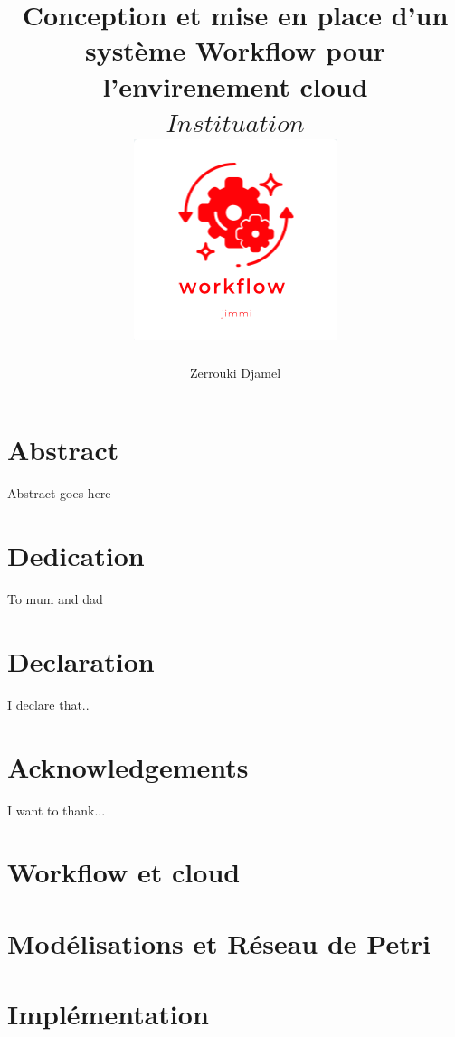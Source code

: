 \documentclass[12pt,twoside]{report}
\title{
	{\textbf{Conception et mise en place d’un système Workflow  pour l’envirenement cloud}} \\   
	{$ Instituation $}\\
	{\includegraphics{logo.PNG}}
}
\author{Zerrouki Djamel}
\begin{document}
\maketitle
 
\chapter*{Abstract}
Abstract goes here

\chapter*{Dedication}
To mum and dad

\chapter*{Declaration}
I declare that..

\chapter*{Acknowledgements}
I want to thank...


\tableofcontents

\chapter{Workflow et cloud}


\chapter{Modélisations et Réseau de Petri}


\chapter{Implémentation}

 
\end{document}
